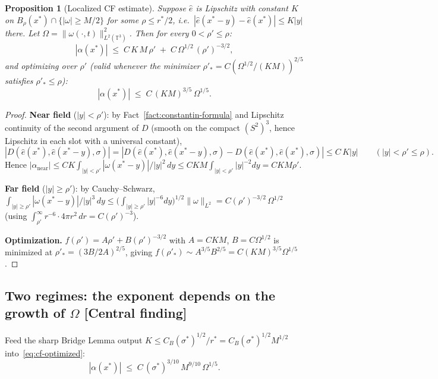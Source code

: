 \documentclass[11pt]{article}
\newtheorem{proposition}[theorem]{Proposition}
\theoremstyle{definition}
\theoremstyle{remark}
\newcommand{\T}{\mathbb{T}}
\begin{document}
\begin{proposition}[Localized CF estimate]\label{prop:localized-cf}
  Suppose $\hat{e}$ is Lipschitz with constant $K$ on
  $B_\rho(x^*)\cap\{|\omega|\geq M/2\}$ for some $\rho\leq r^*/2$, i.e.\
  $|\hat{e}(x^*-y)-\hat{e}(x^*)|\leq K|y|$ there. Let
  $\Omega = \|\omega(\cdot,t)\|_{L^2(\T^3)}^2$. Then for every
  $0<\rho'\leq\rho$:
  \[
    |\alpha(x^*)| \;\leq\; C\,K\,M\,\rho' \;+\; C\,\Omega^{1/2}\,(\rho')^{-3/2},
  \]
  and optimizing over $\rho'$ (valid whenever the minimizer
  $\rho'_* = C(\Omega^{1/2}/(KM))^{2/5}$ satisfies $\rho'_*\leq\rho$):
  \begin{equation}\label{eq:cf-optimized}
    |\alpha(x^*)| \;\leq\; C\,(KM)^{3/5}\,\Omega^{1/5}.
  \end{equation}
\end{proposition}
\begin{proof}
  \textbf{Near field} ($|y|<\rho'$): by
  Fact~\ref{fact:constantin-formula} and Lipschitz continuity of the
  second argument of $D$ (smooth on the compact $(S^2)^3$, hence
  Lipschitz in each slot with a universal constant),
  \[
    |D(\hat{e}(x^*),\hat{e}(x^*-y),\sigma)|
    = |D(\hat{e}(x^*),\hat{e}(x^*-y),\sigma) - D(\hat{e}(x^*),\hat{e}(x^*),\sigma)|
    \leq C\,K|y| \qquad(|y|<\rho'\leq\rho).
  \]
  Hence $|\alpha_{\mathrm{near}}| \leq C K\int_{|y|<\rho'}
  |\omega(x^*-y)|/|y|^2\,dy \leq CKM\int_{|y|<\rho'}|y|^{-2}dy = CKM\rho'$.

  \textbf{Far field} ($|y|\geq\rho'$): by Cauchy--Schwarz,
  $\int_{|y|\geq\rho'}|\omega(x^*-y)|/|y|^3\,dy
  \leq \bigl(\int_{|y|\geq\rho'}|y|^{-6}dy\bigr)^{1/2}\|\omega\|_{L^2}
  = C(\rho')^{-3/2}\,\Omega^{1/2}$
  (using $\int_{\rho'}^\infty r^{-6}\cdot 4\pi r^2\,dr = C(\rho')^{-3}$).

  \textbf{Optimization.} $f(\rho')=A\rho'+B(\rho')^{-3/2}$ with
  $A=CKM$, $B=C\Omega^{1/2}$ is minimized at
  $\rho'_*=(3B/2A)^{2/5}$, giving $f(\rho'_*)\sim A^{3/5}B^{2/5}
  = C(KM)^{3/5}\Omega^{1/5}$.
\end{proof}

\subsection{Two regimes: the exponent depends on the growth of $\Omega$ [Central finding]}

Feed the sharp Bridge Lemma output $K\leq C_B(\sigma^*)^{1/2}/r^* =
C_B(\sigma^*)^{1/2}M^{1/2}$ into~\eqref{eq:cf-optimized}:
\[
  |\alpha(x^*)| \;\leq\; C\,(\sigma^*)^{3/10}\,M^{9/10}\,\Omega^{1/5}.
\]
\end{document}
